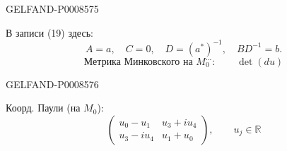 \begin{GelfandAdjacentEvidence}{GELFAND-P000857}{5}


В записи (19) здесь:
\[
A=a,\quad C=0,\quad D=(a^*)^{-1},\quad BD^{-1}=b.\tag{22}
\]
\[
\text{Метрика Минковского на }M_0^{\text{…}}:\qquad \det(du)\tag{23}
\]
\end{GelfandAdjacentEvidence}
\begin{GelfandAdjacentEvidence}{GELFAND-P000857}{6}

Коорд. Паули (на \(M_0\)):
\[
\begin{pmatrix}
u_0-u_1&u_3+i u_4\\
u_3-i u_4&u_1+u_0
\end{pmatrix},\qquad u_j\in\mathbb R\tag{24}
\]
\end{GelfandAdjacentEvidence}



